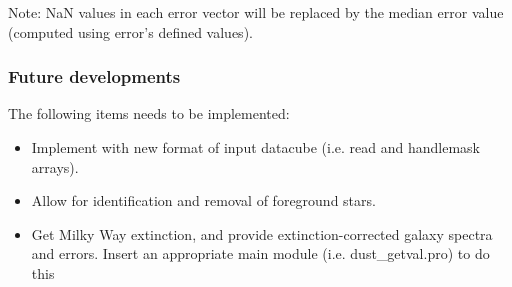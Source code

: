 Note: NaN values in each error vector will be replaced by the median
error value (computed using error's defined values).


\subsubsection{Future developments}

The following items needs to be implemented:

\begin{itemize}
  \item Implement with new format of input datacube (i.e. read and handlemask arrays).
  \item Allow for identification and removal of foreground stars.
  \item Get Milky Way extinction, and provide extinction-corrected galaxy spectra and errors. 
        Insert an appropriate main module (i.e. dust\_getval.pro) to do this
  
\end{itemize}
